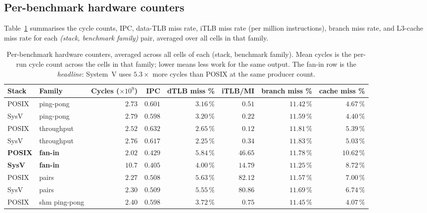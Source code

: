 \documentclass[a4paper,11pt]{article}
\begin{document}
\subsection{Per-benchmark hardware counters}
\label{sec:perf:counters}

Table~\ref{tab:perf_main} summarises the cycle counts, IPC,
data-TLB miss rate, iTLB miss rate (per million instructions),
branch miss rate, and L3-cache miss rate for each
\emph{(stack, benchmark family)} pair, averaged over all cells in
that family.

\begin{table}[H]
\centering
\caption{Per-benchmark hardware counters, averaged across all cells of
each (stack, benchmark family). Mean cycles is the per-run cycle count
across the cells in that family; lower means less work for the same
output. The fan-in row is the \emph{headline}: System~V uses
$5.3\times$ more cycles than POSIX at the same producer count.}
\label{tab:perf_main}
\footnotesize
\begin{tabular}{llrrrrrr}
\toprule
\textbf{Stack} & \textbf{Family} & \textbf{Cycles ($\times 10^9$)} & \textbf{IPC} & \textbf{dTLB miss \%} & \textbf{iTLB/MI} & \textbf{branch miss \%} & \textbf{cache miss \%} \\
\midrule
POSIX & ping-pong       & $2.73$  & $0.601$ & $3.16\,\%$ & $0.51$  & $11.42\,\%$ & $4.67\,\%$ \\
SysV  & ping-pong       & $2.79$  & $0.598$ & $3.20\,\%$ & $0.22$  & $11.59\,\%$ & $4.40\,\%$ \\
\midrule
POSIX & throughput      & $2.52$  & $0.632$ & $2.65\,\%$ & $0.12$  & $11.81\,\%$ & $5.39\,\%$ \\
SysV  & throughput      & $2.76$  & $0.617$ & $2.25\,\%$ & $0.34$  & $11.83\,\%$ & $5.03\,\%$ \\
\midrule
\textbf{POSIX} & \textbf{fan-in} & \textbf{$2.02$}  & $0.429$ & $5.84\,\%$ & $46.65$ & $11.78\,\%$ & $10.62\,\%$ \\
\textbf{SysV}  & \textbf{fan-in} & \textbf{$10.7$}  & $0.405$ & $4.00\,\%$ & $14.79$ & $11.25\,\%$ & $\phantom{0}8.72\,\%$ \\
\midrule
POSIX & pairs           & $2.27$  & $0.508$ & $5.63\,\%$ & $82.12$ & $11.57\,\%$ & $7.00\,\%$ \\
SysV  & pairs           & $2.30$  & $0.509$ & $5.55\,\%$ & $80.86$ & $11.69\,\%$ & $6.74\,\%$ \\
\midrule
POSIX & shm ping-pong   & $2.40$  & $0.598$ & $3.72\,\%$ & $0.75$  & $11.45\,\%$ & $4.07\,\%$ \\

\end{tabular}
\end{table}
\end{document}
